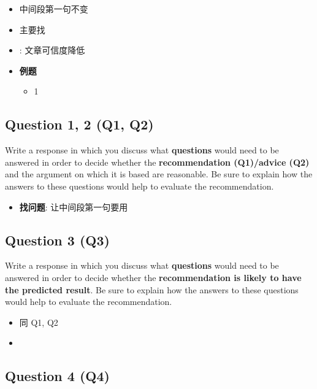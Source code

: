     \begin{itemize}
      \item 中间段第一句不变
      \item 主要找 
      \item {}: 文章可信度降低
      \item \textbf{例题}
      \begin{itemize}
        \item 1
      \end{itemize}
    \end{itemize}

  \subsection{Question 1, 2 (Q1, Q2)}

    Write a response in which you discuss what \textbf{questions} would need to
    be answered in order to decide whether the
    \textbf{recommendation (Q1)/advice (Q2)} and the argument on which it is
    based are reasonable. Be sure to explain how the answers to these questions
    would help to evaluate the recommendation.

    \begin{itemize}
      \item \textbf{找问题}: 让中间段第一句要用
    \end{itemize}

  \subsection{Question 3 (Q3)}

    Write a response in which you discuss what \textbf{questions} would need
    to be answered in order to decide whether the
    \textbf{recommendation is likely to have the predicted result}. Be sure
    to explain how the answers to these questions would help to evaluate the
    recommendation.

    \begin{itemize}
      \item 同 Q1, Q2
      \item {}
    \end{itemize}

  \subsection{Question 4 (Q4)}

